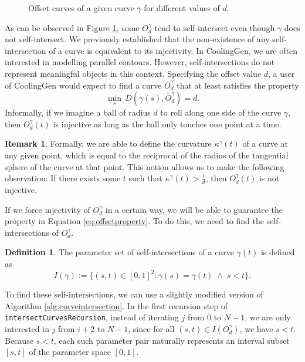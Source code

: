 \documentclass[a4paper, 11pt]{report}
\theoremstyle{definition}
\newtheorem{definition}{Definition}[section]
\newtheorem*{remark}{Remark}
\begin{document}
	\begin{figure}[H]
		\centering
		
		\caption{Offset curves of a given curve $\gamma$ for different values of $d$.}
		\label{fig:offsetcurveexample}
	\end{figure}

	As can be observed in Figure \ref{fig:offsetcurveexample}, some $O^\gamma_d$ tend to self-intersect even though $\gamma$ does not self-intersect. We previously established that the non-existence of any self-intersection of a curve is equivalent to its injectivity. In CoolingGen, we are often interested in modelling parallel contours. However, self-intersections do not represent meaningful objects in this context. Specifying the offset value $d$, a user of CoolingGen would expect to find a curve $\overline{O}^\gamma_d$ that at least satisfies the property
	\begin{equation}\label{eq:offsetproperty}
		\min_s \, D(\gamma(s), \overline{O}^\gamma_d) = d.
	\end{equation}
	Informally, if we imagine a ball of radius $d$ to roll along one side of the curve $\gamma$, then $O^\gamma_d(t)$ is injective as long as the ball only touches one point at a time.
	\begin{remark}
		Formally, we are able to define the curvature $\kappa^\gamma(t)$ of a curve at any given point, which is equal to the reciprocal of the radius of the tangential sphere of the curve at that point. This notion allows us to make the following observation: If there exists some $t$ such that $\kappa^\gamma(t) > \frac{1}{d}$, then $O^\gamma_d(t)$ is not injective.
	\end{remark}

	If we force injectivity of $O^\gamma_d$ in a certain way, we will be able to guarantee the property in Equation \ref{eq:offsetproperty}. To do this, we need to find the self-intersections of $O^\gamma_d$.

	\begin{definition}
		The parameter set of self-intersections of a curve $\gamma(t)$ is defined as
			$$ I(\gamma) := \{(s,t) \in [0,1]^2 : \gamma(s) = \gamma(t) \;\wedge\; s < t \}. $$
	\end{definition}

	To find these self-intersections, we can use a slightly modified version of Algorithm \ref{alg:curveintersection}. In the first recursion step of \texttt{intersectCurvesRecursion}, instead of iterating $j$ from $0$ to $N-1$, we are only interested in $j$ from $i+2$ to $N-1$, since for all $(s,t) \in I(O^\gamma_d)$, we have $s < t$. Because $s < t$, each such parameter pair naturally represents an interval subset $[s, t]$ of the parameter space $[0, 1]$.
\end{document}
